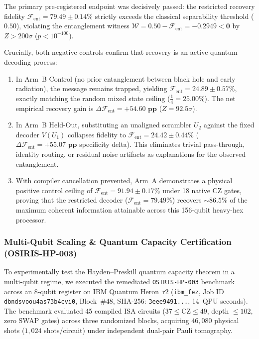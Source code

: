 \documentclass[aps,preprint,superscriptaddress,longbibliography]{revtex4-2}
\begin{document}
The primary pre-registered endpoint was decisively passed: the restricted recovery fidelity $\mathcal{F}_{\mathrm{ent}} = \mathbf{79.49 \pm 0.14\%}$ strictly exceeds the classical separability threshold ($0.50$), violating the entanglement witness $\mathcal{W} = 0.50 - \mathcal{F}_{\mathrm{ent}} = \mathbf{-0.2949 < 0}$ by $Z > 200\sigma$ ($p < 10^{-100}$). 

Crucially, both negative controls confirm that recovery is an active quantum decoding process:
\begin{enumerate}
\item In Arm~B Control (no prior entanglement between black hole and early radiation), the message remains trapped, yielding $\mathcal{F}_{\mathrm{ent}} = 24.89 \pm 0.57\%$, exactly matching the random mixed state ceiling ($\frac{1}{4} = 25.00\%$). The net empirical recovery gain is $\Delta \mathcal{F}_{\mathrm{ent}} = \mathbf{+54.60\text{ pp}}$ ($Z = 92.5\sigma$).
\item In Arm~B Held-Out, substituting an unaligned scrambler $U_2$ against the fixed decoder $V(U_1)$ collapses fidelity to $\mathcal{F}_{\mathrm{ent}} = 24.42 \pm 0.44\%$ ($\Delta \mathcal{F}_{\mathrm{ent}} = \mathbf{+55.07\text{ pp}}$ specificity delta). This eliminates trivial pass-through, identity routing, or residual noise artifacts as explanations for the observed entanglement.
\item With compiler cancellation prevented, Arm~A demonstrates a physical positive control ceiling of $\mathcal{F}_{\mathrm{ent}} = \mathbf{91.94 \pm 0.17\%}$ under 18 native CZ gates, proving that the restricted decoder ($\mathcal{F}_{\mathrm{ent}} = 79.49\%$) recovers $\sim 86.5\%$ of the maximum coherent information attainable across this 156-qubit heavy-hex processor.
\end{enumerate}

\subsubsection{Multi-Qubit Scaling \& Quantum Capacity Certification (OSIRIS-HP-003)}
\label{sec:hp_multiqubit}

To experimentally test the Hayden--Preskill quantum capacity theorem in a multi-qubit regime, we executed the remediated \texttt{OSIRIS-HP-003} benchmark across an 8-qubit register on IBM Quantum Heron~r2 (\texttt{ibm\_fez}, Job ID \texttt{dbndsvoou4as73b4cvi0}, Block~\#48, SHA-256: \texttt{3eee9491...}, 14~QPU seconds). The benchmark evaluated 45 compiled ISA circuits ($37 \le \text{CZ} \le 49$, depth $\le 102$, zero SWAP gates) across three randomized blocks, acquiring $46{,}080$ physical shots ($1{,}024$ shots/circuit) under independent dual-pair Pauli tomography.
\end{document}

